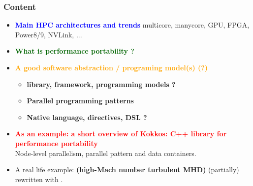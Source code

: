 \documentclass[9pt,hyperref={pdfpagemode=FullScreen,urlcolor=blue},xcolor=x11names]{beamer}
\begin{document}
\begin{frame}
  \frametitle{Content}
  
  {%
    \begin{itemize}
    \item \textcolor{blue}{\textbf{Main HPC architectures and trends}}
      multicore, manycore, GPU, FPGA, Power8/9, NVLink, ...
    \item \textcolor{darkgreen}{\textbf{What is performance portability ?}}\\
    \item \textcolor{orange}{\textbf{A good software abstraction / programing model(s) (?)}}
      
      \begin{itemize}
      \item \textbf{library, framework, programming models ?}
      \item \textbf{Parallel programming patterns}
      \item \textbf{Native language, directives, DSL ?}
      \end{itemize}
    \item \textcolor{red}{\textbf{As an example: a short overview of Kokkos: C++ library for performance portability}}\\
      Node-level parallelism, parallel pattern and data containers.
    \item A real life example: \textbf{ (high-Mach number turbulent MHD)} (partially) rewritten with .
    \end{itemize}%
  }
\end{frame}
\end{document}
